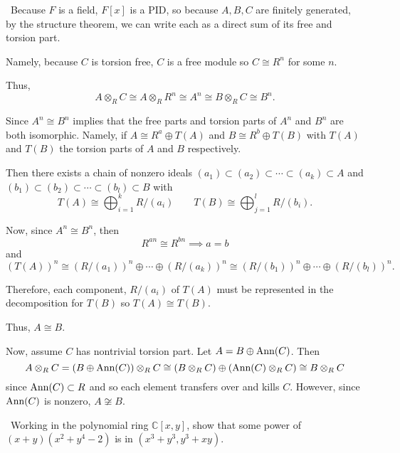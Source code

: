 \documentclass[12pt]{Qual}
\begin{document}
\begin{solution}$\,$
Because $F$ is a field, $F[x]$ is a PID, so because $A,B,C$ are finitely generated, by the structure theorem, we can write each as a direct sum of its free and torsion part.

Namely, because $C$ is torsion free, $C$ is a free module so $C\cong R^n$ for some $n$.

Thus, $$A\otimes_RC\cong A\otimes_RR^n\cong A^n\cong B\otimes_RC\cong B^n.$$

Since $A^n\cong B^n$ implies that the free parts and torsion parts of $A^n$ and $B^n$ are both isomorphic. Namely, if $A\cong R^a\oplus T(A)$ and $B\cong R^b\oplus T(B)$ with $T(A)$ and $T(B)$ the torsion parts of $A$ and $B$ respectively.

Then there exists a chain of nonzero ideals $(a_1) \subset (a_2) \subset \cdots \subset(a_k)\subset A$ and $(b_1)\subset (b_2)\subset\cdots\subset (b_l)\subset B$ with $$T(A)\cong \bigoplus_{i=1}^kR/(a_i)\qquad T(B)\cong\bigoplus_{j=1}^lR/(b_i).$$

Now, since $A^n\cong B^n$, then $$R^{an}\cong R^{bn}\implies a=b$$ and $$(T(A))^n\cong (R/(a_1))^n\oplus\cdots\oplus (R/(a_k))^n\cong (R/(b_1))^n\oplus\cdots\oplus (R/(b_l))^n.$$

Therefore, each component, $R/(a_i)$ of $T(A)$ must be represented in the decomposition for $T(B)$ so $T(A)\cong T(B)$.

Thus, $A\cong B$.

Now, assume $C$ has nontrivial torsion part. Let $A=B\oplus \text{Ann}(C)$. Then $$A\otimes_RC=(B\oplus\text{Ann}(C))\otimes_RC\cong (B\otimes_RC)\oplus(\text{Ann}(C)\otimes_RC)\cong B\otimes_RC$$ since $\text{Ann}(C)\subset R$ and so each element transfers over and kills $C.$ However, since $\text{Ann}(C)$ is nonzero, $A\not\cong B.$
\end{solution}
\newpage



\begin{problem} $\,$
Working in the polynomial ring $\mathbb{C}[x,y]$, show that some power of $(x+y)(x^2+y^4-2)$ is in $(x^3+y^3,y^3+xy)$.
\end{problem}
\end{document}
